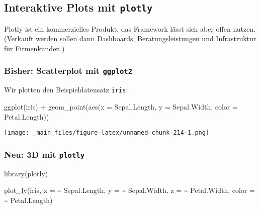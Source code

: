 \documentclass[
  ngerman,
]{article}
\newenvironment{Shaded}{\begin{snugshade}}{\end{snugshade}}
\newcommand{\AttributeTok}[1]{\textcolor[rgb]{0.77,0.63,0.00}{#1}}
\newcommand{\FunctionTok}[1]{\textcolor[rgb]{0.00,0.00,0.00}{#1}}
\newcommand{\NormalTok}[1]{#1}
\newcommand{\SpecialCharTok}[1]{\textcolor[rgb]{0.00,0.00,0.00}{#1}}
\begin{document}
\hypertarget{interaktive-plots-mit-plotly}{%
\subsection{\texorpdfstring{Interaktive Plots mit \texttt{plotly}}{Interaktive Plots mit plotly}}\label{interaktive-plots-mit-plotly}}

Plotly ist ein kommerzielles Produkt, das Framework lässt sich aber offen nutzen. (Verkauft werden sollen dann Dashboards, Beratungsleistungen und Infrastruktur für Firmenkunden.)

\hypertarget{bisher-scatterplot-mit-ggplot2}{%
\subsubsection{\texorpdfstring{Bisher: Scatterplot mit \texttt{ggplot2}}{Bisher: Scatterplot mit ggplot2}}\label{bisher-scatterplot-mit-ggplot2}}

Wir plotten den Beispieldatensatz \texttt{iris}:

\begin{Shaded}
\begin{Highlighting}[]
\FunctionTok{ggplot}\NormalTok{(iris) }\SpecialCharTok{+}
  \FunctionTok{geom\_point}\NormalTok{(}\FunctionTok{aes}\NormalTok{(}\AttributeTok{x =}\NormalTok{ Sepal.Length, }\AttributeTok{y =}\NormalTok{ Sepal.Width, }\AttributeTok{color =}\NormalTok{ Petal.Length))}
\end{Highlighting}
\end{Shaded}

\texttt{[image: \_main\_files/figure-latex/unnamed-chunk-214-1.png]}

\hypertarget{neu-3d-mit-plotly}{%
\subsubsection{\texorpdfstring{Neu: 3D mit \texttt{plotly}}{Neu: 3D mit plotly}}\label{neu-3d-mit-plotly}}

\begin{Shaded}
\begin{Highlighting}[]
\FunctionTok{library}\NormalTok{(plotly)}

\FunctionTok{plot\_ly}\NormalTok{(iris, }\AttributeTok{x =} \SpecialCharTok{\textasciitilde{}}\NormalTok{ Sepal.Length, }\AttributeTok{y =} \SpecialCharTok{\textasciitilde{}}\NormalTok{ Sepal.Width, }\AttributeTok{z =} \SpecialCharTok{\textasciitilde{}}\NormalTok{ Petal.Width, }\AttributeTok{color =} \SpecialCharTok{\textasciitilde{}}\NormalTok{ Petal.Length)}
\end{Highlighting}
\end{Shaded}
\end{document}
